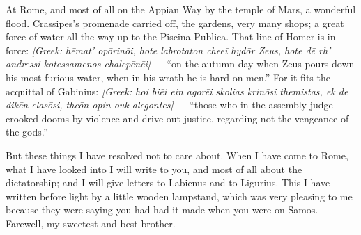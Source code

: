 

 At Rome, and most of all on the Appian Way by the temple of Mars, a wonderful flood. Crassipes's promenade carried off, the gardens, very many shops; a great force of water all the way up to the Piscina Publica. That line of Homer is in force: \textit{[Greek: h\=emat' op\=orin\=oi, hote labrotaton chee\=i hyd\=or Zeus, hote d\=e rh' andressi kotessamenos chalep\=en\=ei]} --- ``on the autumn day when Zeus pours down his most furious water, when in his wrath he is hard on men.'' For it fits the acquittal of Gabinius: \textit{[Greek: hoi bi\=ei ein agor\=ei skolias krin\=osi themistas, ek de dik\=en elas\=osi, the\=on opin ouk alegontes]} --- ``those who in the assembly judge crooked dooms by violence and drive out justice, regarding not the vengeance of the gods.''

 But these things I have resolved not to care about. When I have come to Rome, what I have looked into I will write to you, and most of all about the dictatorship; and I will give letters to Labienus and to Ligurius. This I have written before light by a little wooden lampstand, which was very pleasing to me because they were saying you had had it made when you were on Samos. Farewell, my sweetest and best brother.
